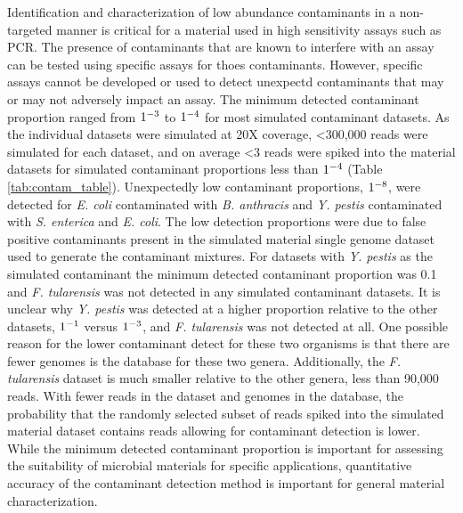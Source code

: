 \documentclass[fleqn,10pt,lineno]{wlpeerj}\usepackage[]{graphicx}\usepackage[]{color}
\begin{document}
Identification and characterization of low abundance contaminants in a non-targeted manner is critical for a material used in high sensitivity assays such as PCR.  
The presence of contaminants that are known to interfere with an assay can be tested using specific assays for thoes contaminants. 
However, specific assays cannot be developed or used to detect unexpectd contaminants that may or may not adversely impact an assay. 
The minimum detected contaminant proportion ranged from $1 \time 10^{-3}$ to $1 \time 10^{-4}$ for most simulated contaminant datasets. 
As the individual datasets were simulated at 20X coverage, \textless 300,000 reads were simulated for each dataset, and on average \textless 3 reads were spiked into the material datasets for simulated contaminant proportions less than $1 \time 10^{-4}$ (Table \ref{tab:contam_table}). 
Unexpectedly low contaminant proportions, $1 \time 10^{-8}$, were detected for \textit{E. coli} contaminated with \textit{B. anthracis} and \textit{Y. pestis} contaminated with \textit{S. enterica} and \textit{E. coli}. 
The low detection proportions were due to false positive contaminants present in the simulated material single genome dataset used to generate the contaminant mixtures. 
For datasets with \textit{Y. pestis} as the simulated contaminant the minimum detected contaminant proportion was 0.1 and \textit{F. tularensis} was not detected in any simulated contaminant datasets. 
It is unclear why \textit{Y. pestis} was detected at a higher proportion relative to the other datasets, $1 \time 10^{-1}$ versus $1 \time 10^{-3}$, and \textit{F. tularensis} was not detected at all. 
One possible reason for the lower contaminant detect for these two organisms is that there are fewer genomes is the database for these two genera. 
Additionally, the \textit{F. tularensis} dataset is much smaller relative to the other genera, less than 90,000 reads. 
With fewer reads in the dataset and genomes in the database, the probability that the randomly selected subset of reads spiked into the simulated material dataset contains reads allowing for contaminant detection is lower. 
While the minimum detected contaminant proportion is important for assessing the suitability of microbial materials for specific applications, quantitative accuracy of the contaminant detection method is important for general material characterization.
\end{document}
